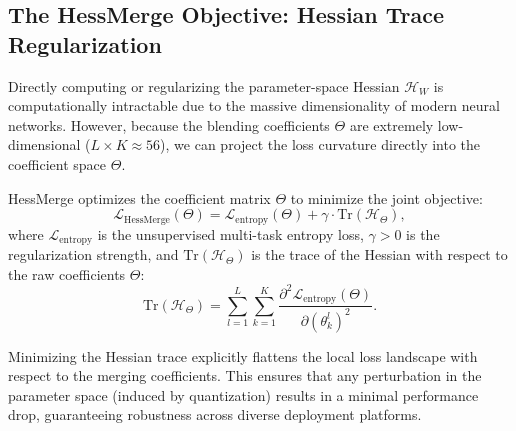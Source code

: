 \subsection{The HessMerge Objective: Hessian Trace Regularization}
Directly computing or regularizing the parameter-space Hessian $\mathcal{H}_W$ is computationally intractable due to the massive dimensionality of modern neural networks. However, because the blending coefficients $\Theta$ are extremely low-dimensional ($L \times K \approx 56$), we can project the loss curvature directly into the coefficient space $\Theta$.

HessMerge optimizes the coefficient matrix $\Theta$ to minimize the joint objective:
\begin{equation}
    \mathcal{L}_{\text{HessMerge}}(\Theta) = \mathcal{L}_{\text{entropy}}(\Theta) + \gamma \cdot \text{Tr}\left(\mathcal{H}_{\Theta}\right),
\end{equation}
where $\mathcal{L}_{\text{entropy}}$ is the unsupervised multi-task entropy loss, $\gamma > 0$ is the regularization strength, and $\text{Tr}\left(\mathcal{H}_{\Theta}\right)$ is the trace of the Hessian with respect to the raw coefficients $\Theta$:
\begin{equation}
    \text{Tr}\left(\mathcal{H}_{\Theta}\right) = \sum_{l=1}^L \sum_{k=1}^K \frac{\partial^2 \mathcal{L}_{\text{entropy}}(\Theta)}{\partial (\theta_k^l)^2}.
\end{equation}

Minimizing the Hessian trace explicitly flattens the local loss landscape with respect to the merging coefficients. This ensures that any perturbation in the parameter space (induced by quantization) results in a minimal performance drop, guaranteeing robustness across diverse deployment platforms.
